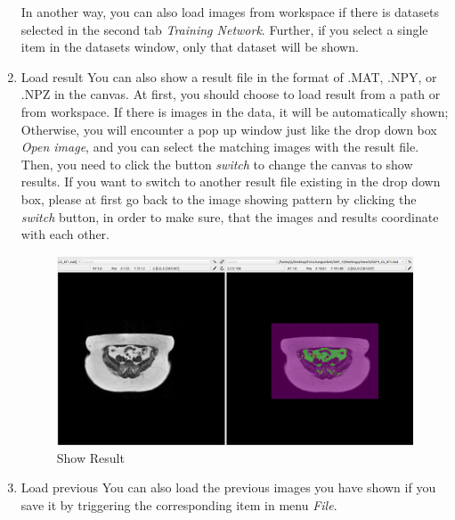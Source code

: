 \documentclass[12pt]{article}
\begin{document}
\begin{enumerate}
	In another way, you can also load images from workspace if there is datasets selected in the second tab \textit{Training Network}. Further, if you select a single item in the datasets window, only that dataset will be shown. 
	\item Load result
	\newline You can also show a result file in the format of .MAT, .NPY, or .NPZ in the canvas. At first, you should choose to load result from a path or from workspace. If there is images in the data, it will be automatically shown; Otherwise, you will encounter a pop up window just like the drop down box \textit{Open image}, and you can select the matching images with the result file. Then, you need to click the button \textit{switch} to change the canvas to show results. If you want to switch to another result file existing in the drop down box, please at first go back to the image showing pattern by clicking the \textit{switch} button, in order to make sure, that the images and results coordinate with each other.
	\begin{figure}[htbp]	
		\centering
		\includegraphics[width=\textwidth]{show_result.png}
		\caption[Show Result]{Show Result}
		\label{fig:show_result}
	\end{figure}
	\item Load previous
	\newline You can also load the previous images you have shown if you save it by triggering the corresponding item in menu \textit{File}.
\end{enumerate}
\end{document}
